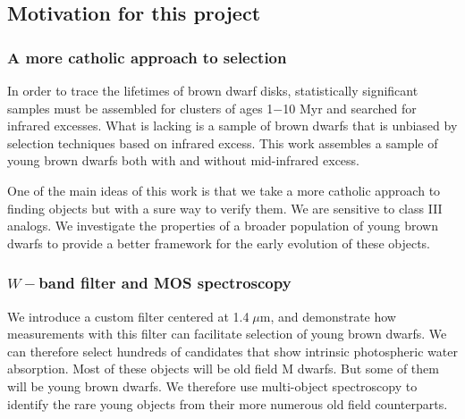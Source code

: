 
\subsection{Motivation for this project}

\subsubsection{A more catholic approach to selection}
In order to trace the lifetimes of brown dwarf disks, statistically significant samples must be assembled for clusters of ages 1$-$10 Myr and searched for infrared excesses.  What is lacking is a sample of brown dwarfs that is unbiased by selection techniques based on infrared excess.  This work assembles a sample of young brown dwarfs both with and without mid-infrared excess.

One of the main ideas of this work is that we take a more catholic approach to finding objects but with a sure way to verify them.  We are sensitive to class III analogs.  We investigate the properties of a broader population of young brown dwarfs to provide a better framework for the early evolution of these objects.



\subsubsection{ $W-$band filter and MOS spectroscopy}
We introduce a custom filter centered at 1.4$\;\mu$m, and demonstrate how measurements with this filter can facilitate selection of young brown dwarfs.  We can therefore select hundreds of candidates that show intrinsic photospheric water absorption.  Most of these objects will be old field M dwarfs.  But some of them will be young brown dwarfs.  We therefore use multi-object spectroscopy to identify the rare young objects from their more numerous old field counterparts.

